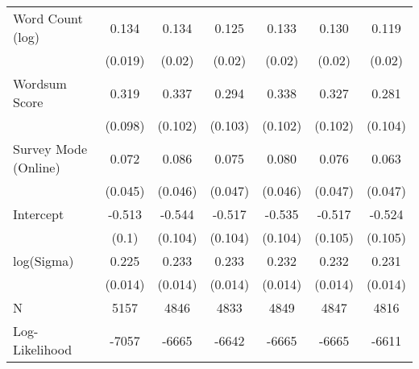 \begin{table}[ht]
\begin{tabular}{lcccccc}
  Word Count (log) &  0.134 &  0.134 &  0.125 &  0.133 &  0.130 &  0.119 \\ 
   & (0.019) & (0.02) & (0.02) & (0.02) & (0.02) & (0.02) \\ 
  Wordsum Score &  0.319 &  0.337 &  0.294 &  0.338 &  0.327 &  0.281 \\ 
   & (0.098) & (0.102) & (0.103) & (0.102) & (0.102) & (0.104) \\ 
  Survey Mode (Online) &  0.072 &  0.086 &  0.075 &  0.080 &  0.076 &  0.063 \\ 
   & (0.045) & (0.046) & (0.047) & (0.046) & (0.047) & (0.047) \\ 
  Intercept & -0.513 & -0.544 & -0.517 & -0.535 & -0.517 & -0.524 \\ 
   & (0.1) & (0.104) & (0.104) & (0.104) & (0.105) & (0.105) \\ 
  log(Sigma) &  0.225 &  0.233 &  0.233 &  0.232 &  0.232 &  0.231 \\ 
   & (0.014) & (0.014) & (0.014) & (0.014) & (0.014) & (0.014) \\ 
   \hline
N & 5157 & 4846 & 4833 & 4849 & 4847 & 4816 \\ 
  Log-Likelihood & -7057 & -6665 & -6642 & -6665 & -6665 & -6611 \\ 
   \hline
\end{tabular}
\endgroup
\end{table}
